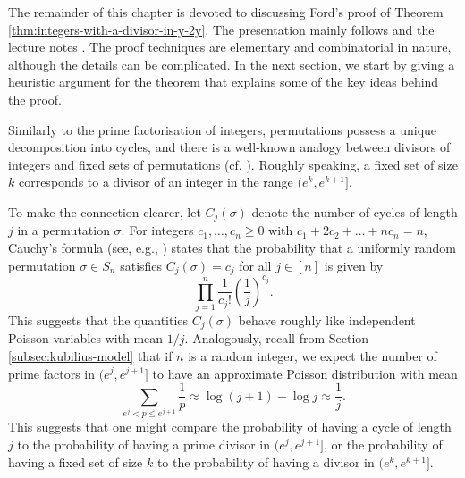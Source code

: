 The remainder of this chapter is devoted to discussing Ford's proof of Theorem \ref{thm:integers-with-a-divisor-in-y-2y}.
The presentation mainly follows \cite{integerswithadivisor} and the lecture notes \cite{fordlecturenotes}.
The proof techniques are elementary and combinatorial in nature, although the details can be complicated. 
In the next section, we start by giving a heuristic argument for the theorem that explains some of the key ideas behind the proof.

\begin{remark}
    Similarly to the prime factorisation of integers, permutations possess a unique decomposition into cycles, and there is a well-known analogy between divisors of integers and fixed sets of permutations (cf. \cite{arratiabarbourtavare}).
    Roughly speaking, a fixed set of size $k$ corresponds to a divisor of an integer in the range $(e^k, e^{k + 1}]$.
    
    To make the connection clearer, let $C_j(\sigma)$ denote the number of cycles of length $j$ in a permutation $\sigma$.
    For integers $c_1, \dots, c_n \ge 0$ with $c_1 + 2c_2 + \dots + nc_n = n$, Cauchy's formula (see, e.g., \cite[Prop. 1.3.2]{enumerativecombinatorics}) states that the probability that a uniformly random permutation $\sigma \in S_n$ satisfies $C_j(\sigma) = c_j$ for all $j \in [n]$ is given by
    \begin{equation*}
        \prod \limits_{j = 1}^n \frac{1}{c_j!} \left( \frac{1}{j} \right)^{c_j}.
    \end{equation*}
    This suggests that the quantities $C_j(\sigma)$ behave roughly like independent Poisson variables with mean $1/j$.
    Analogously, recall from Section \ref{subsec:kubilius-model} that if $n$ is a random integer, we expect the number of prime factors in $(e^j, e^{j + 1}]$ to have an approximate Poisson distribution with mean
    \begin{equation*}
        \sum \limits_{e^j < p \le e^{j + 1}} \frac{1}{p} \approx \log (j + 1) - \log j \approx \frac{1}{j}.
    \end{equation*}
    This suggests that one might compare the probability of having a cycle of length $j$ to the probability of having a prime divisor in $(e^j, e^{j + 1}]$, or the probability of having a fixed set of size $k$ to the probability of having a divisor in $(e^k, e^{k + 1}]$.
    

\end{remark}
